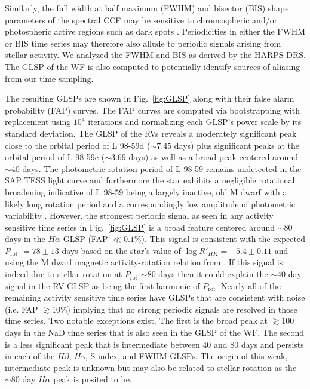 \documentclass[longauth]{aa}
\newcommand{\prot}{$P_{\text{rot}}$}
\begin{document}
Similarly, the full width at half maximum (FWHM) and bisector (BIS) shape parameters of the spectral CCF may be
sensitive to chromospheric and/or photospheric active regions such as dark spots \citep{queloz01,desort07}.
Periodicities in either the FWHM or BIS time series may therefore also allude to periodic signals arising from
stellar activity. We analyzed the FWHM and BIS as derived by the HARPS DRS. The GLSP of the WF is also computed
to potentially identify sources of aliasing from our time sampling.

The resulting GLSPs are shown in Fig.~\ref{fig:GLSP} along with their false alarm probability (FAP) curves. The FAP curves are computed via bootstrapping with replacement using $10^4$ iterations and normalizing each GLSP's power scale by its standard deviation. The GLSP of the RVs reveals a moderately significant peak close to the orbital period of L 98-59d ($\sim 7.45$ days) plus significant peaks at the orbital period of L 98-59c ($\sim 3.69$ days) as well as a broad peak centered around $\sim 40$ days. The photometric rotation period of L 98-59 remains undetected in the SAP TESS light curve and furthermore the star exhibits a negligible rotational broadening  indicative of L 98-59 being a largely inactive, old M dwarf with a likely long rotation period and a correspondingly low amplitude of photometric variability \citep{newton16a}. However, the strongest periodic signal as seen in any activity sensitive time series in Fig.~\ref{fig:GLSP} is a broad feature centered around $\sim 80$ days in the $H\alpha$ GLSP (FAP $\ll 0.1$\%). This signal is consistent with the expected \prot{} $=78\pm 13$ days based on the star's value of $\log{R'_{HK}}=-5.4\pm 0.11$ and using the M dwarf magnetic activity-rotation relation from \cite{astudillodefru17b}.
If this signal is indeed due to stellar rotation at \prot{} $\sim 80$ days then it could explain the $\sim 40$ day signal in the RV GLSP as being the first harmonic of \prot{.} Nearly all of the remaining activity sensitive time series have GLSPs that are consistent with noise (i.e. FAP $\gtrsim 10$\%) implying that no strong periodic signals are resolved in those time series. Two notable exceptions exist. The first is the broad peak at $\gtrsim 100$ days in the NaD time series that is also seen in the GLSP of the WF. The second is a less significant peak that is intermediate between 40 and 80 days and persists in each of the $H\beta$, $H\gamma$, S-index, and FWHM GLSPs. The origin of this weak, intermediate peak is unknown but may also be related to stellar rotation as the $\sim 80$ day $H\alpha$ peak is posited to be.
\end{document}
